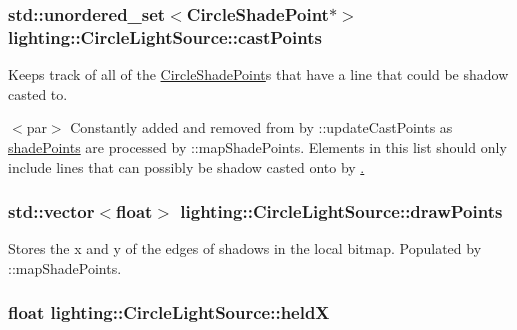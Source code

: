 \subsubsection[{\texorpdfstring{cast\+Points}{castPoints}}]{\setlength{\rightskip}{0pt plus 5cm}std\+::unordered\+\_\+set$<${\bf Circle\+Shade\+Point}$\ast$$>$ lighting\+::\+Circle\+Light\+Source\+::cast\+Points\hspace{0.3cm}{\ttfamily [protected]}}\hypertarget{classlighting_1_1CircleLightSource_ab25c86954fad0715d502d1f60649ede4}{}\label{classlighting_1_1CircleLightSource_ab25c86954fad0715d502d1f60649ede4}


Keeps track of all of the \hyperlink{classlighting_1_1CircleShadePoint}{Circle\+Shade\+Point}s that have a line that could be shadow casted to. 

$<$par$>$ Constantly added and removed from by \+::update\+Cast\+Points as \hyperlink{classlighting_1_1CircleLightSource_acdfea64be9d142f669338c5e206e753e}{shade\+Points} are processed by \+::map\+Shade\+Points. Elements in this list should only include lines that can possibly be shadow casted onto by \hyperlink{}{. } 
\subsubsection[{\texorpdfstring{draw\+Points}{drawPoints}}]{\setlength{\rightskip}{0pt plus 5cm}std\+::vector$<$float$>$ lighting\+::\+Circle\+Light\+Source\+::draw\+Points\hspace{0.3cm}{\ttfamily [protected]}}\hypertarget{classlighting_1_1CircleLightSource_ac1a26422cd969278b321679503d42a07}{}\label{classlighting_1_1CircleLightSource_ac1a26422cd969278b321679503d42a07}


Stores the x and y of the edges of shadows in the local bitmap. Populated by \+::map\+Shade\+Points. 

\subsubsection[{\texorpdfstring{heldX}{heldX}}]{\setlength{\rightskip}{0pt plus 5cm}float lighting\+::\+Circle\+Light\+Source\+::heldX\hspace{0.3cm}{\ttfamily [protected]}}\hypertarget{classlighting_1_1CircleLightSource_aa008d846fd893f0ff40e5994af4d487e}{}\label{classlighting_1_1CircleLightSource_aa008d846fd893f0ff40e5994af4d487e}


